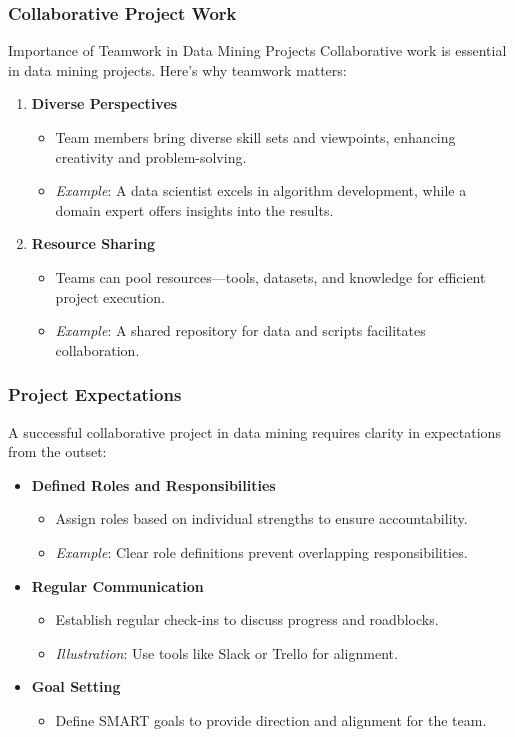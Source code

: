 \documentclass[aspectratio=169]{beamer}
\begin{document}
\begin{frame}[fragile]
    \frametitle{Collaborative Project Work}
    \begin{block}{Importance of Teamwork in Data Mining Projects}
        Collaborative work is essential in data mining projects. Here's why teamwork matters:
    \end{block}
    \begin{enumerate}
        \item \textbf{Diverse Perspectives}
        \begin{itemize}
            \item Team members bring diverse skill sets and viewpoints, enhancing creativity and problem-solving.
            \item \textit{Example}: A data scientist excels in algorithm development, while a domain expert offers insights into the results.
        \end{itemize}
        \item \textbf{Resource Sharing}
        \begin{itemize}
            \item Teams can pool resources—tools, datasets, and knowledge for efficient project execution.
            \item \textit{Example}: A shared repository for data and scripts facilitates collaboration.
        \end{itemize}
    \end{enumerate}
\end{frame}

\begin{frame}[fragile]
    \frametitle{Project Expectations}
    A successful collaborative project in data mining requires clarity in expectations from the outset:
    \begin{itemize}
        \item \textbf{Defined Roles and Responsibilities}
        \begin{itemize}
            \item Assign roles based on individual strengths to ensure accountability.
            \item \textit{Example}: Clear role definitions prevent overlapping responsibilities.
        \end{itemize}
        \item \textbf{Regular Communication}
        \begin{itemize}
            \item Establish regular check-ins to discuss progress and roadblocks.
            \item \textit{Illustration}: Use tools like Slack or Trello for alignment.
        \end{itemize}
        \item \textbf{Goal Setting}
        \begin{itemize}
            \item Define SMART goals to provide direction and alignment for the team.
        \end{itemize}
    \end{itemize}
\end{frame}
\end{document}
